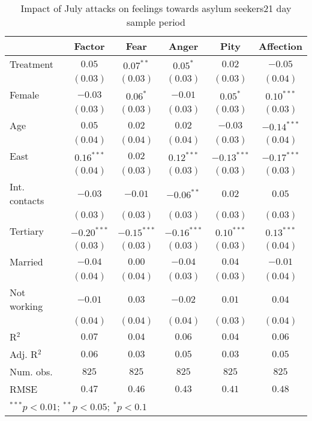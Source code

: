
\begin{table}
\caption{Impact of July attacks on feelings towards asylum seekers21 day sample period}
\begin{center}
\begin{tabular}{l c c c c c}
\toprule
 & Factor & Fear & Anger & Pity & Affection \\
\midrule
Treatment     & $0.05$        & $0.07^{**}$   & $0.05^{*}$    & $0.02$        & $-0.05$       \\
              & $(0.03)$      & $(0.03)$      & $(0.03)$      & $(0.03)$      & $(0.04)$      \\
Female        & $-0.03$       & $0.06^{*}$    & $-0.01$       & $0.05^{*}$    & $0.10^{***}$  \\
              & $(0.03)$      & $(0.03)$      & $(0.03)$      & $(0.03)$      & $(0.03)$      \\
Age           & $0.05$        & $0.02$        & $0.02$        & $-0.03$       & $-0.14^{***}$ \\
              & $(0.04)$      & $(0.04)$      & $(0.04)$      & $(0.03)$      & $(0.04)$      \\
East          & $0.16^{***}$  & $0.02$        & $0.12^{***}$  & $-0.13^{***}$ & $-0.17^{***}$ \\
              & $(0.04)$      & $(0.03)$      & $(0.03)$      & $(0.03)$      & $(0.03)$      \\
Int. contacts & $-0.03$       & $-0.01$       & $-0.06^{**}$  & $0.02$        & $0.05$        \\
              & $(0.03)$      & $(0.03)$      & $(0.03)$      & $(0.03)$      & $(0.03)$      \\
Tertiary      & $-0.20^{***}$ & $-0.15^{***}$ & $-0.16^{***}$ & $0.10^{***}$  & $0.13^{***}$  \\
              & $(0.03)$      & $(0.03)$      & $(0.03)$      & $(0.03)$      & $(0.04)$      \\
Married       & $-0.04$       & $0.00$        & $-0.04$       & $0.04$        & $-0.01$       \\
              & $(0.04)$      & $(0.04)$      & $(0.03)$      & $(0.03)$      & $(0.04)$      \\
Not working   & $-0.01$       & $0.03$        & $-0.02$       & $0.01$        & $0.04$        \\
              & $(0.04)$      & $(0.04)$      & $(0.04)$      & $(0.03)$      & $(0.04)$      \\
\midrule
R$^2$         & $0.07$        & $0.04$        & $0.06$        & $0.04$        & $0.06$        \\
Adj. R$^2$    & $0.06$        & $0.03$        & $0.05$        & $0.03$        & $0.05$        \\
Num. obs.     & $825$         & $825$         & $825$         & $825$         & $825$         \\
RMSE          & $0.47$        & $0.46$        & $0.43$        & $0.41$        & $0.48$        \\
\bottomrule
\multicolumn{6}{l}{\scriptsize{$^{***}p<0.01$; $^{**}p<0.05$; $^{*}p<0.1$}}
\end{tabular}
\label{tab_emo_21}
\end{center}
\end{table}
